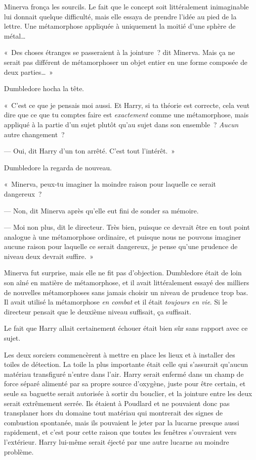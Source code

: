 Minerva fronça les sourcils. Le fait que le concept soit littéralement inimaginable lui donnait quelque difficulté, mais elle essaya de prendre l'idée au pied de la lettre. Une métamorphose appliquée à uniquement la moitié d'une sphère de métal…

«~Des choses étranges se passeraient à la jointure~? dit Minerva. Mais ça ne serait pas différent de métamorphoser un objet entier en une forme composée de deux parties…~»

Dumbledore hocha la tête.

«~C'est ce que je pensais moi aussi. Et Harry, si ta théorie est correcte, cela veut dire que ce que tu comptes faire est \emph{exactement} comme une métamorphose, mais appliqué à la partie d'un sujet plutôt qu'au sujet dans son ensemble~? \emph{Aucun} autre changement~?

--- Oui, dit Harry d'un ton arrêté. C'est tout l'intérêt.~»

Dumbledore la regarda de nouveau.

«~Minerva, peux-tu imaginer la moindre raison pour laquelle ce serait dangereux~?

--- Non, dit Minerva après qu'elle eut fini de sonder sa mémoire.

--- Moi non plus, dit le directeur. Très bien, puisque ce devrait être en tout point analogue à une métamorphose ordinaire, et puisque nous ne pouvons imaginer aucune raison pour laquelle ce serait dangereux, je pense qu'une prudence de niveau deux devrait suffire.~»

Minerva fut surprise, mais elle ne fit pas d'objection. Dumbledore était de loin son aîné en matière de métamorphose, et il avait littéralement essayé des milliers de nouvelles métamorphoses sans jamais choisir un niveau de prudence trop bas. Il avait utilisé la métamorphose \emph{en combat} et il était \emph{toujours en vie}. Si le directeur pensait que le deuxième niveau suffisait, ça suffisait.

Le fait que Harry allait certainement échouer était bien sûr sans rapport avec ce sujet.

Les deux sorciers commencèrent à mettre en place les lieux et à installer des toiles de détection. La toile la plus importante était celle qui s'assurait qu'aucun matériau transfiguré n'entre dans l'air. Harry serait enfermé dans un champ de force séparé alimenté par sa propre source d'oxygène, juste pour être certain, et seule sa baguette serait autorisée à sortir du bouclier, et la jointure entre les deux serait extrêmement serrée. Ils étaient à Poudlard et ne pouvaient donc pas transplaner hors du domaine tout matériau qui montrerait des signes de combustion spontanée, mais ils pouvaient le jeter par la lucarne presque aussi rapidement, et c'est pour cette raison que toutes les fenêtres s'ouvraient vers l'extérieur. Harry lui-même serait éjecté par une autre lucarne au moindre problème.

